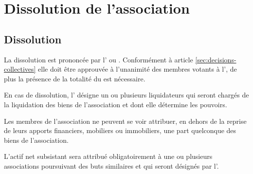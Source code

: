 \documentclass[a4paper,french,10pt]{article}
\newcommand{\article}[1]{\subsection{#1}\addtocounter{article}{1}}
\newcounter{article}
\newcommand{\artref}[1]{article \ref{#1}}
\begin{document}
\section{Dissolution de l’association}

\article{Dissolution}
\label{sec:dissolution}
La dissolution est prononcée par l'\AGO{} ou \AGE{}. Conformément à \artref{sec:decisions-collectives} elle doit être approuvée à l'unanimité des membres votants à l'\AG{}, de plus la présence de la totalité du \bureau{} est nécessaire.

En cas de dissolution, l’\AG{} désigne un ou plusieurs
liquidateurs qui seront chargés de la liquidation des biens de
l’association et dont elle détermine les pouvoirs.

Les membres de l’association ne peuvent se voir attribuer, en dehors
de la reprise de leurs apports financiers, mobiliers ou immobiliers,
une part quelconque des biens de l’association.

L’actif net subsistant sera attribué obligatoirement à une ou
plusieurs associations poursuivant des buts similaires et qui seront
désignés par l’\AG{}.
\end{document}
